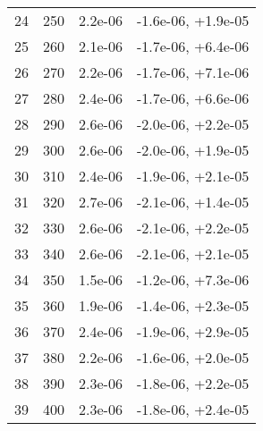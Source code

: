 \begin{table}
\begin{adjustbox}{width=1\textwidth/2}
\begin{tabular}{|c|c|c|c|}
\cline{1-4}
24 & 250 & 2.2e-06 & -1.6e-06, +1.9e-05 \\
\cline{1-4}
25 & 260 & 2.1e-06 & -1.7e-06, +6.4e-06 \\
\cline{1-4}
26 & 270 & 2.2e-06 & -1.7e-06, +7.1e-06 \\
\cline{1-4}
27 & 280 & 2.4e-06 & -1.7e-06, +6.6e-06 \\
\cline{1-4}
28 & 290 & 2.6e-06 & -2.0e-06, +2.2e-05 \\
\cline{1-4}
29 & 300 & 2.6e-06 & -2.0e-06, +1.9e-05 \\
\cline{1-4}
30 & 310 & 2.4e-06 & -1.9e-06, +2.1e-05 \\
\cline{1-4}
31 & 320 & 2.7e-06 & -2.1e-06, +1.4e-05 \\
\cline{1-4}
32 & 330 & 2.6e-06 & -2.1e-06, +2.2e-05 \\
\cline{1-4}
33 & 340 & 2.6e-06 & -2.1e-06, +2.1e-05 \\
\cline{1-4}
34 & 350 & 1.5e-06 & -1.2e-06, +7.3e-06 \\
\cline{1-4}
35 & 360 & 1.9e-06 & -1.4e-06, +2.3e-05 \\
\cline{1-4}
36 & 370 & 2.4e-06 & -1.9e-06, +2.9e-05 \\
\cline{1-4}
37 & 380 & 2.2e-06 & -1.6e-06, +2.0e-05 \\
\cline{1-4}
38 & 390 & 2.3e-06 & -1.8e-06, +2.2e-05 \\
\cline{1-4}
39 & 400 & 2.3e-06 & -1.8e-06, +2.4e-05 \\
\cline{1-4}
\end{tabular}
\end{adjustbox}
\end{table}

